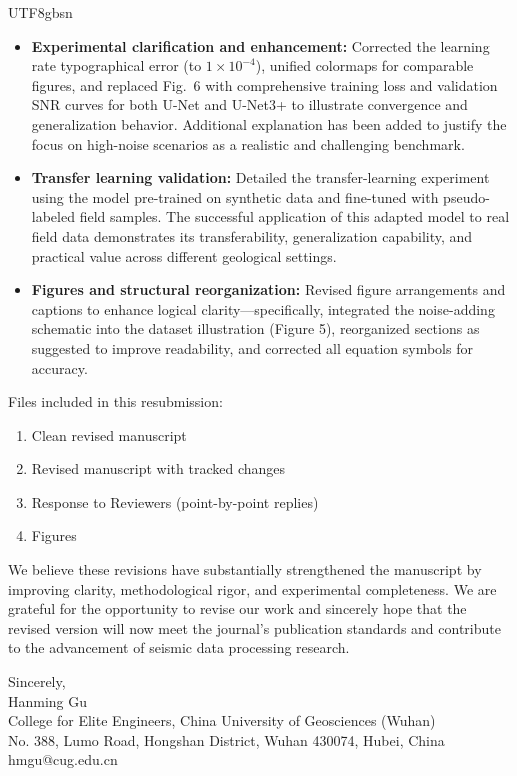 \documentclass[12pt]{article}
\begin{document}
\begin{CJK}{UTF8}{gbsn}
\begin{itemize}
  \item \textbf{Experimental clarification and enhancement:} 
  Corrected the learning rate typographical error (to $1\times10^{-4}$), unified colormaps for comparable figures, and replaced Fig.~6 with comprehensive training loss and validation SNR curves for both U-Net and U-Net3+ to illustrate convergence and generalization behavior. 
  Additional explanation has been added to justify the focus on high-noise scenarios as a realistic and challenging benchmark.
  
  \item \textbf{Transfer learning validation:} 
  Detailed the transfer-learning experiment using the model pre-trained on synthetic data and fine-tuned with pseudo-labeled field samples. 
  The successful application of this adapted model to real field data demonstrates its transferability, generalization capability, and practical value across different geological settings.
  
  \item \textbf{Figures and structural reorganization:} 
  Revised figure arrangements and captions to enhance logical clarity—specifically, integrated the noise-adding schematic into the dataset illustration (Figure 5), reorganized sections as suggested to improve readability, and corrected all equation symbols for accuracy.
\end{itemize}

\vspace{6pt}
\noindent
Files included in this resubmission:
\begin{enumerate}
  \item Clean revised manuscript 
  \item Revised manuscript with tracked changes 
  \item Response to Reviewers (point-by-point replies)
  \item Figures 
\end{enumerate}

\vspace{6pt}
\noindent
We believe these revisions have substantially strengthened the manuscript by improving clarity, methodological rigor, and experimental completeness. 
We are grateful for the opportunity to revise our work and sincerely hope that the revised version will now meet the journal’s publication standards and contribute to the advancement of seismic data processing research.

\vspace{12pt}

\noindent
Sincerely,\\
Hanming Gu \\
College for Elite Engineers, China University of Geosciences (Wuhan) \\
No. 388, Lumo Road, Hongshan District, Wuhan 430074, Hubei, China \\
hmgu@cug.edu.cn

\end{CJK}
\end{document}
